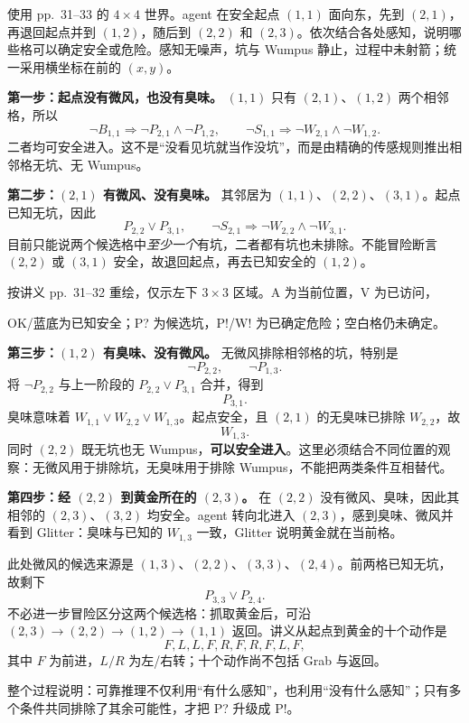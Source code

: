 使用 pp.~31--33 的 $4\times4$ 世界。agent 在安全起点 $(1,1)$ 面向东，先到 $(2,1)$，再退回起点并到 $(1,2)$，随后到 $(2,2)$ 和 $(2,3)$。依次结合各处感知，说明哪些格可以确定安全或危险。感知无噪声，坑与 Wumpus 静止，过程中未射箭；统一采用横坐标在前的 $(x,y)$。

\begin{workedsolution}
\textbf{第一步：起点没有微风，也没有臭味。}
$(1,1)$ 只有 $(2,1)$、$(1,2)$ 两个相邻格，所以
\[
  \neg B_{1,1}\Rightarrow\neg P_{2,1}\land\neg P_{1,2},\qquad
  \neg S_{1,1}\Rightarrow\neg W_{2,1}\land\neg W_{1,2}.
\]
二者均可安全进入。这不是“没看见坑就当作没坑”，而是由精确的传感规则推出相邻格无坑、无 Wumpus。

\textbf{第二步：$(2,1)$ 有微风、没有臭味。}
其邻居为 $(1,1)$、$(2,2)$、$(3,1)$。起点已知无坑，因此
\[
  \boxed{P_{2,2}\lor P_{3,1}},\qquad
  \neg S_{2,1}\Rightarrow\neg W_{2,2}\land\neg W_{3,1}.
\]
目前只能说两个候选格中\emph{至少一个}有坑，二者都有坑也未排除。不能冒险断言 $(2,2)$ 或 $(3,1)$ 安全，故退回起点，再去已知安全的 $(1,2)$。

\begin{center}
  

  \small 按讲义 pp.~31--32 重绘，仅示左下 $3\times3$ 区域。A 为当前位置，V 为已访问，\par
  OK/蓝底为已知安全；P? 为候选坑，P!/W! 为已确定危险；空白格仍未确定。
\end{center}

\textbf{第三步：$(1,2)$ 有臭味、没有微风。}
无微风排除相邻格的坑，特别是
\[
  \neg P_{2,2},\qquad\neg P_{1,3}.
\]
将 $\neg P_{2,2}$ 与上一阶段的 $P_{2,2}\lor P_{3,1}$ 合并，得到
\[
  \boxed{P_{3,1}}.
\]
臭味意味着 $W_{1,1}\lor W_{2,2}\lor W_{1,3}$。起点安全，且 $(2,1)$ 的无臭味已排除 $W_{2,2}$，故
\[
  \boxed{W_{1,3}}.
\]
同时 $(2,2)$ 既无坑也无 Wumpus，\textbf{可以安全进入}。这里必须结合不同位置的观察：无微风用于排除坑，无臭味用于排除 Wumpus，不能把两类条件互相替代。

\textbf{第四步：经 $(2,2)$ 到黄金所在的 $(2,3)$。}
在 $(2,2)$ 没有微风、臭味，因此其相邻的 $(2,3)$、$(3,2)$ 均安全。agent 转向北进入 $(2,3)$，感到臭味、微风并看到 Glitter：臭味与已知的 $W_{1,3}$ 一致，Glitter 说明黄金就在当前格。

此处微风的候选来源是 $(1,3)$、$(2,2)$、$(3,3)$、$(2,4)$。前两格已知无坑，故剩下
\[
  P_{3,3}\lor P_{2,4}.
\]
不必进一步冒险区分这两个候选格：抓取黄金后，可沿 $(2,3)\to(2,2)\to(1,2)\to(1,1)$ 返回。讲义从起点到黄金的十个动作是
\[
  F,L,L,F,R,F,R,F,L,F,
\]
其中 $F$ 为前进，$L/R$ 为左/右转；十个动作尚不包括 Grab 与返回。

整个过程说明：可靠推理不仅利用“有什么感知”，也利用“没有什么感知”；只有多个条件共同排除了其余可能性，才把 P? 升级成 P!。
\end{workedsolution}

